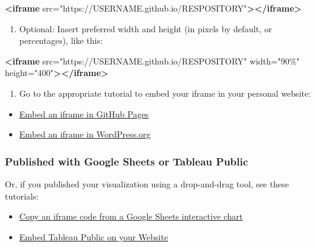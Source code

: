 \documentclass[
  english,
]{book}
\newenvironment{Shaded}{\begin{snugshade}}{\end{snugshade}}
\newcommand{\KeywordTok}[1]{\textcolor[rgb]{0.13,0.29,0.53}{\textbf{#1}}}
\newcommand{\OtherTok}[1]{\textcolor[rgb]{0.56,0.35,0.01}{#1}}
\newcommand{\StringTok}[1]{\textcolor[rgb]{0.31,0.60,0.02}{#1}}
\providecommand{\tightlist}{%
  \setlength{\itemsep}{0pt}\setlength{\parskip}{0pt}}
\begin{document}
\begin{Shaded}
\begin{Highlighting}[]
\KeywordTok{<iframe}\OtherTok{ src=}\StringTok{"https://USERNAME.github.io/RESPOSITORY"}\KeywordTok{></iframe>}
\end{Highlighting}
\end{Shaded}

\begin{enumerate}
\def\labelenumi{\arabic{enumi})}
\setcounter{enumi}{2}
\tightlist
\item
  Optional: Insert preferred width and height (in pixels by default, or percentages), like this:
\end{enumerate}

\begin{Shaded}
\begin{Highlighting}[]
\KeywordTok{<iframe}\OtherTok{ src=}\StringTok{"https://USERNAME.github.io/RESPOSITORY"}\OtherTok{ width=}\StringTok{"90\%"}\OtherTok{ height=}\StringTok{"400"}\KeywordTok{></iframe>}
\end{Highlighting}
\end{Shaded}

\begin{enumerate}
\def\labelenumi{\arabic{enumi})}
\setcounter{enumi}{3}
\tightlist
\item
  Go to the appropriate tutorial to embed your iframe in your personal website:
\end{enumerate}

\begin{itemize}
\tightlist
\item
  \href{iframe-github}{Embed an iframe in GitHub Pages}
\item
  \href{iframe-wordpress}{Embed an iframe in WordPress.org}
\end{itemize}

\hypertarget{published-with-google-sheets-or-tableau-public}{%
\subsubsection*{Published with Google Sheets or Tableau Public}\label{published-with-google-sheets-or-tableau-public}}

Or, if you published your visualization using a drop-and-drag tool, see these tutorials:

\begin{itemize}
\tightlist
\item
  \href{iframe-google-sheets}{Copy an iframe code from a Google Sheets interactive chart}
\item
  \href{iframe-tableau}{Embed Tableau Public on your Website}
\end{itemize}
\end{document}
